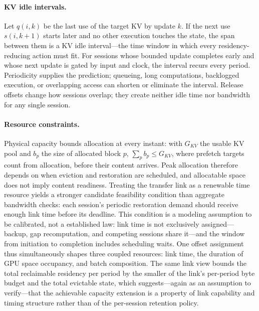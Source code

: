 \paragraph{KV idle intervals.}
Let $q(i,k)$ be the last use of the target KV by update $k$. If the next use
$s(i,k+1)$ starts later and no other execution touches the state, the span
between them is a KV idle interval---the time window in which every
residency-reducing action must fit. For sessions whose bounded update
completes early and whose next update is gated by input and clock, the
interval recurs every period. Periodicity supplies the prediction; queueing,
long computations, backlogged execution, or overlapping access can shorten or
eliminate the interval. Release offsets change how sessions overlap; they
create neither idle time nor bandwidth for any single session.

\paragraph{Resource constraints.}
Physical capacity bounds allocation at every instant: with $G_{KV}$ the usable
KV pool and $b_p$ the size of allocated block $p$, $\sum_{p} b_p \le G_{KV}$,
where prefetch targets count from allocation, before their content arrives.
Peak allocation therefore depends on when eviction and restoration are
scheduled, and allocatable space does not imply content readiness. Treating
the transfer link as a renewable time resource yields a stronger candidate
feasibility condition than aggregate bandwidth checks: each session's periodic
restoration demand should receive enough link time before its deadline. This
condition is a modeling assumption to be calibrated, not a established law:
link time is not exclusively assigned---backup, gap recomputation, and
competing sessions share it---and the window from initiation to completion
includes scheduling waits. One offset assignment thus simultaneously shapes
three coupled resources: link time, the duration of GPU space occupancy, and
batch composition. The same link view bounds the total reclaimable residency
per period by the smaller of the link's per-period byte budget and the total
evictable state, which suggests---again as an assumption to verify---that the
achievable capacity extension is a property of link capability and timing
structure rather than of the per-session retention policy.
